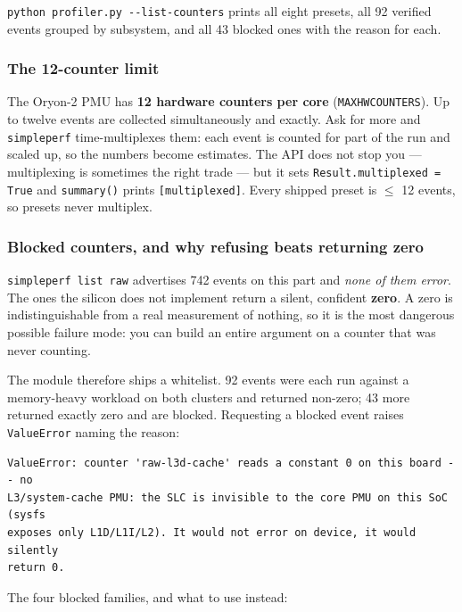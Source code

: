 \documentclass[11pt,a4paper]{article}
\newcommand{\code}[1]{\texttt{\let\_\breakableunderscore #1}}
\newcommand{\breakableunderscore}{\textunderscore\allowbreak}
\begin{document}
\noindent \code{python profiler.py -{}-list-counters} prints all eight presets,
all 92 verified events grouped by subsystem, and all 43 blocked ones with the
reason for each.

\subsubsection*{The 12-counter limit}

The Oryon-2 PMU has \textbf{12 hardware counters per core}
(\code{MAX\_HW\_COUNTERS}). Up to twelve events are collected simultaneously and
exactly. Ask for more and \code{simpleperf} time-multiplexes them: each event is
counted for part of the run and scaled up, so the numbers become estimates.
The API does not stop you --- multiplexing is sometimes the right trade --- but
it sets \code{Result.multiplexed = True} and \code{summary()} prints
\code{[multiplexed]}. Every shipped preset is $\leq$ 12 events, so presets never
multiplex.

\subsubsection*{Blocked counters, and why refusing beats returning zero}

\code{simpleperf list raw} advertises 742 events on this part and \emph{none of
them error}. The ones the silicon does not implement return a silent, confident
\textbf{zero}. A zero is indistinguishable from a real measurement of nothing,
so it is the most dangerous possible failure mode: you can build an entire
argument on a counter that was never counting.

The module therefore ships a whitelist. 92 events were each run against a
memory-heavy workload on both clusters and returned non-zero; 43 more returned
exactly zero and are blocked. Requesting a blocked event raises
\code{ValueError} naming the reason:

\begin{lstlisting}[style=plain]
ValueError: counter 'raw-l3d-cache' reads a constant 0 on this board -- no
L3/system-cache PMU: the SLC is invisible to the core PMU on this SoC (sysfs
exposes only L1D/L1I/L2). It would not error on device, it would silently
return 0.
\end{lstlisting}

\noindent The four blocked families, and what to use instead:
\end{document}
